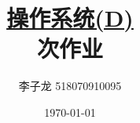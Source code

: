 \documentclass[12pt,a4paper]{article}
\newenvironment{problems}{\begin{list}{}{\renewcommand{\makelabel}[1]{\textbf{##1}\hfil}}}{\end{list}}
\providecommand{\ans}{\textbf{答}:~}
\begin{document}
\title{\normalsize \underline{操作系统(D)}\\ 次作业}
\author{李子龙 518070910095}
\date{\today}
\maketitle



\end{document}

